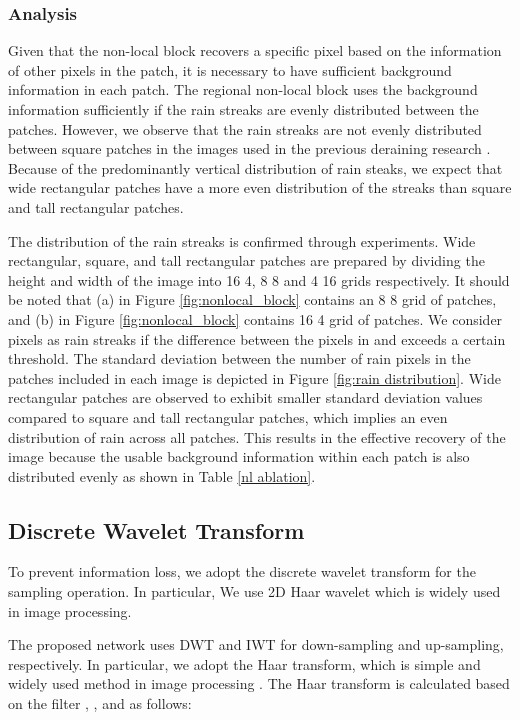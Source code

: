 \documentclass[a4paper,fleqn]{cas-dc}
\begin{document}
\subsubsection{Analysis}
\label{analysis}




Given that the non-local block recovers a specific pixel based on the information of other pixels in the patch, it is necessary to have sufficient background information in each patch. The regional non-local block uses the background information sufficiently if the rain streaks are evenly distributed between the patches. However, we observe that the rain streaks are not evenly distributed between square patches in the images used in the previous deraining research \cite{li2018non,yu2019gradual}. Because of the predominantly vertical distribution of rain steaks, we expect that wide rectangular patches have a more even distribution of the streaks than square and tall rectangular patches. 



The distribution of the rain streaks is confirmed through experiments. Wide rectangular, square, and tall rectangular patches are prepared by dividing the height and width of the image into 16  4, 8  8 and 4  16 grids respectively. It should be noted that (a) in Figure \ref{fig:nonlocal_block} contains an 8  8 grid of patches, and (b) in Figure \ref{fig:nonlocal_block} contains 16  4 grid of patches. We consider pixels as rain streaks if the difference between the pixels in  and  exceeds a certain threshold. The standard deviation between the number of rain pixels in the patches included in each image is depicted in Figure \ref{fig:rain distribution}. Wide rectangular patches are observed to exhibit smaller standard deviation values compared to square and tall rectangular patches, which implies an even distribution of rain across all patches. This results in the effective recovery of the image because the usable background information within each patch is also distributed evenly as shown in Table \ref{nl ablation}.


\subsection{Discrete Wavelet Transform}
\label{sec:wavelet transform}
To prevent information loss, we adopt the discrete wavelet transform for the sampling operation. In particular, We use 2D Haar wavelet which is widely used in image processing.

The proposed network uses DWT and IWT for down-sampling and up-sampling, respectively. In particular, we adopt the Haar transform, which is simple and widely used method in image processing \cite{guo2017deep,liu2018multi,porwik2004haar,shen2018deep,yang2019scale}. The Haar transform is calculated based on the filter , ,  and  as follows: 
\end{document}
